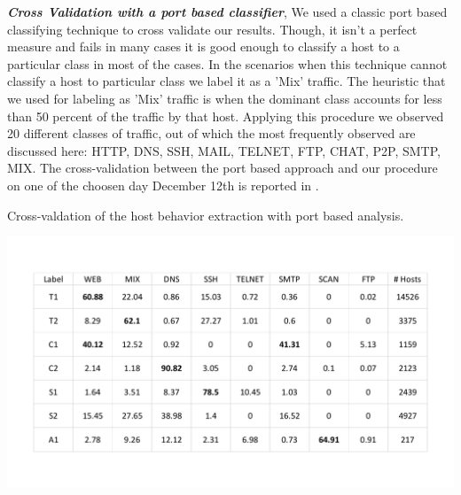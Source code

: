 \textbf{\textit{Cross Validation with a port based classifier}}, We used a classic port based classifying technique to cross validate our results. Though, it isn't a perfect measure and fails in many cases it is good enough to classify a host to a particular class in most of the cases.
In the scenarios when this technique cannot classify a host to particular class we label it as a 'Mix' traffic. The heuristic that we used for labeling as 'Mix' traffic is when the dominant class accounts for less than 50 percent of the traffic by that host. Applying this procedure we observed 20 different classes of traffic, out of which the most frequently observed are discussed here: HTTP, DNS, SSH, MAIL, TELNET, FTP, CHAT, P2P, SMTP, MIX. The cross-validation between the port based approach and  our procedure on one of the choosen day December 12th is reported in .

\begin{table}[t]
	\caption{Cross-valdation of the host behavior extraction with port based analysis.}%
	\centerline{\includegraphics[scale = 0.5]{validation.pdf}}	
\end{table}

